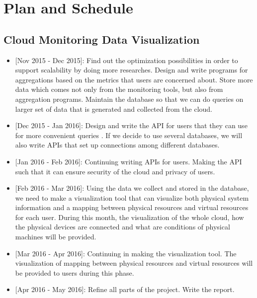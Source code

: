\section{Plan and Schedule}
\label{sec:Plan}



\subsection{Cloud Monitoring Data Visualization}
\begin{itemize}
\item{[Nov 2015 - Dec 2015]:} Find out the optimization possibilities in order to support scalability by doing more researches. Design and write programs for aggregations based on the metrics that users are concerned about. Store more data which comes not only from the monitoring tools, but also from aggregation programs. Maintain the database so that we can do queries on larger set of data that is generated and collected from the cloud.  
\item{[Dec 2015 - Jan 2016]:} Design and write the API for users that they can use for more convenient queries . If we decide to use several databases, we will also write APIs that set up connections among different databases. 
\item{[Jan 2016 - Feb 2016]:} Continuing writing APIs for users. Making the API such that it can ensure security of the cloud and privacy of users. 
\item{[Feb 2016 - Mar 2016]:} Using the data we collect and stored in the database, we need to make a visualization tool that can visualize both physical system information and a mapping between physical resources and virtual resources for each user. During this month, the visualization of the whole cloud, how the physical devices are connected and what are conditions of physical machines will be provided.  
\item{[Mar 2016 - Apr 2016]:} Continuing in making the visualization tool. The visualization of mapping between physical resources and virtual resources will be provided to users during this phase.  
\item{[Apr 2016 - May 2016]:} Refine all parts of the project. Write the report.
\end{itemize}
